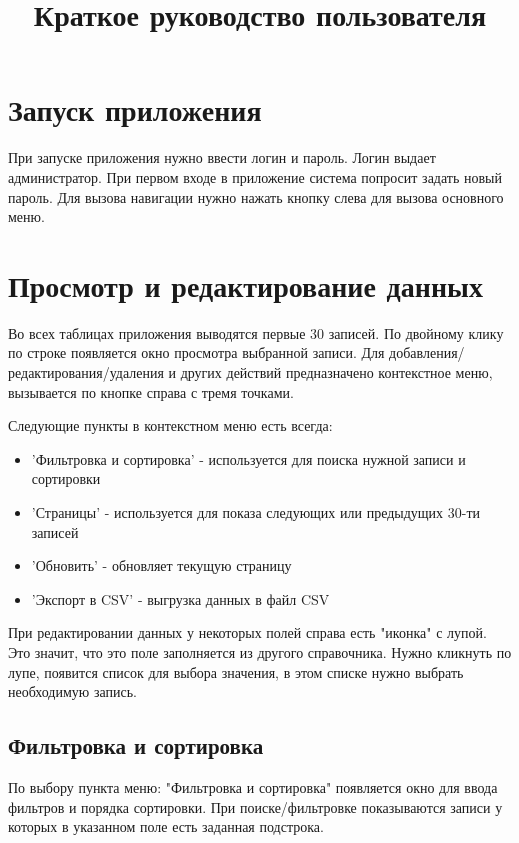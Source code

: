 \documentclass[12pt, a4paper]{article}
\title{Краткое руководство пользователя}
\begin{document}
\maketitle

\section{Запуск приложения}

При запуске приложения нужно ввести логин и пароль. Логин выдает администратор. 
При первом входе в приложение система попросит задать новый пароль. Для вызова навигации нужно нажать кнопку слева для вызова основного меню. 

\section{Просмотр и редактирование данных} 

Во всех таблицах приложения выводятся первые 30 записей. По двойному клику по строке
появляется окно просмотра выбранной записи.
Для добавления/редактирования/удаления и других действий предназначено контекстное меню, вызывается
по кнопке справа с тремя точками. 


Следующие пункты в контекстном меню есть всегда:

\begin{itemize}
    \item {'Фильтровка и сортировка' - используется для поиска нужной записи и сортировки}
    \item {'Страницы' - используется для показа следующих или предыдущих 30-ти записей }
    \item {'Обновить' - обновляет текущую страницу}
    \item {'Экспорт в CSV' - выгрузка данных в файл CSV}
\end{itemize}

При редактировании данных у некоторых полей справа есть "иконка" с лупой. Это значит, что это поле 
заполняется из другого справочника. Нужно кликнуть по лупе, появится список для выбора значения, в этом списке
нужно выбрать необходимую запись.

\subsection{Фильтровка и сортировка}
По выбору пункта меню: "Фильтровка и сортировка" 
появляется окно для ввода фильтров и порядка сортировки.
При поиске/фильтровке показываются записи у которых в указанном поле есть заданная подстрока.
\end{document}
